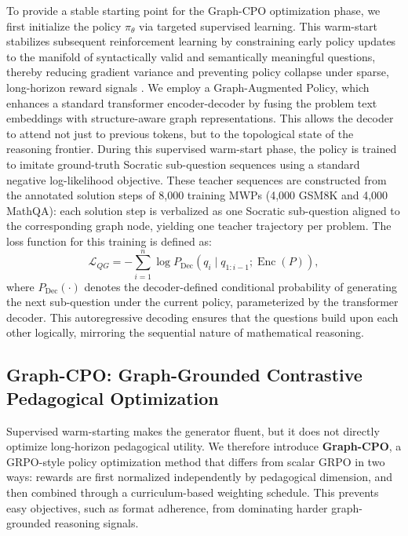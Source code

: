 \documentclass[sigconf, anonymous, review, screen]{acmart}
\begin{document}
To provide a stable starting point for the Graph-CPO optimization phase, we first initialize the policy $\pi_\theta$ via targeted supervised learning. This warm-start stabilizes subsequent reinforcement learning by constraining early policy updates to the manifold of syntactically valid and semantically meaningful questions, thereby reducing gradient variance and preventing policy collapse under sparse, long-horizon reward signals \cite{cobbe2021training}. We employ a Graph-Augmented Policy, which enhances a standard transformer encoder-decoder by fusing the problem text embeddings with structure-aware graph representations. This allows the decoder to attend not just to previous tokens, but to the topological state of the reasoning frontier. During this supervised warm-start phase, the policy is trained to imitate ground-truth Socratic sub-question sequences using a standard negative log-likelihood objective. These teacher sequences are constructed from the annotated solution steps of 8{,}000 training MWPs (4{,}000 GSM8K and 4{,}000 MathQA): each solution step is verbalized as one Socratic sub-question aligned to the corresponding graph node, yielding one teacher trajectory per problem. The loss function for this training is defined as:
\begin{equation}
    \mathcal{L}_{QG} = -\sum_{i=1}^{n} \log P_{\text{Dec}}(q_i \mid q_{1:i-1}; \operatorname{Enc}(P)),
    \label{eq:lqg}
\end{equation}
where $P_{\text{Dec}}(\cdot)$ denotes the decoder-defined conditional probability of generating the next sub-question under the current policy, parameterized by the transformer decoder. This autoregressive decoding ensures that the questions build upon each other logically, mirroring the sequential nature of mathematical reasoning.

\subsection{Graph-CPO: Graph-Grounded Contrastive Pedagogical Optimization}
\label{sec:cpo}

Supervised warm-starting makes the generator fluent, but it does not directly optimize long-horizon pedagogical utility. We therefore introduce \textbf{Graph-CPO}, a GRPO-style policy optimization method \cite{shao2024deepseekmath} that differs from scalar GRPO in two ways: rewards are first normalized independently by pedagogical dimension, and then combined through a curriculum-based weighting schedule. This prevents easy objectives, such as format adherence, from dominating harder graph-grounded reasoning signals.
\end{document}
